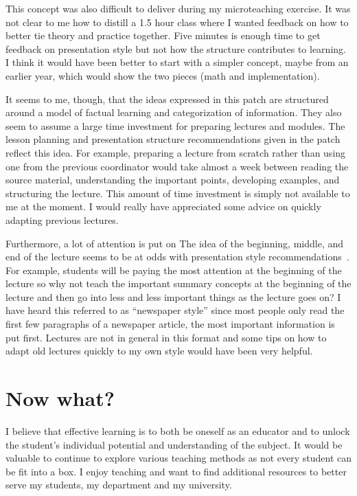 \documentclass[
]{article}
\begin{document}
This concept was also difficult to deliver during my microteaching
exercise. It was not clear to me how to distill a 1.5 hour class where I
wanted feedback on how to better tie theory and practice together. Five
minutes is enough time to get feedback on presentation style but not how
the structure contributes to learning. I think it would have been better
to start with a simpler concept, maybe from an earlier year, which would
show the two pieces (math and implementation).

It seems to me, though, that the ideas expressed in this patch are
structured around a model of factual learning and categorization of
information. They also seem to assume a large time investment for
preparing lectures and modules. The lesson planning and presentation
structure recommendations given in the patch reflect this idea. For
example, preparing a lecture from scratch rather than using one from the
previous coordinator would take almost a week between reading the source
material, understanding the important points, developing examples, and
structuring the lecture. This amount of time investment is simply not
available to me at the moment. I would really have appreciated some
advice on quickly adapting previous lectures.

Furthermore, a lot of attention is put on The idea of the beginning, middle,
and end of the lecture seems to be at odds with presentation style
recommendations~\cite{Reynolds:2007,Duarte:2008}. For example, students will be
paying the most attention at the beginning of the lecture so why not teach the
important summary concepts at the beginning of the lecture and then go into
less and less important things as the lecture goes on? I have heard this
referred to as ``newspaper style'' since most people only read the first few
paragraphs of a newspaper article, the most important information is put first.
Lectures are not in general in this format and some tips on how to adapt old
lectures quickly to my own style would have been very helpful.

\hypertarget{now-what}{%
\section{Now what?}\label{now-what}}

I believe that effective learning is to both be oneself as an educator
and to unlock the student's individual potential and understanding of
the subject. It would be valuable to continue to explore various
teaching methods as not every student can be fit into a box. I enjoy
teaching and want to find additional resources to better serve my
students, my department and my university.
\end{document}
